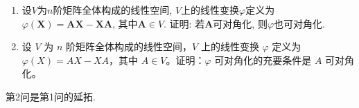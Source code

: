 \documentclass[../../main.tex]{subfiles}
\begin{document}
\begin{example}
\begin{enumerate}
\item 设\(V\)为\(n\)阶矩阵全体构成的线性空间, \(V\)上的线性变换\(\varphi\)定义为\(\varphi(\boldsymbol{X})=\boldsymbol{A}\boldsymbol{X}-\boldsymbol{X}\boldsymbol{A}\), 其中\(\boldsymbol{A}\in V\). 证明: 若\(\boldsymbol{A}\)可对角化, 则\(\varphi\)也可对角化.

\item 设 $V$ 为 $n$ 阶矩阵全体构成的线性空间，$V$ 上的线性变换 $\varphi$ 定义为 $\varphi(X)=AX - XA$，其中 $A\in V$。证明：$\varphi$ 可对角化的充要条件是 $A$ 可对角化。
\end{enumerate}
\end{example}
\begin{remark}
\begin{remark}
第2问是第1问的延拓.
\end{remark}
\end{remark}
\end{document}
